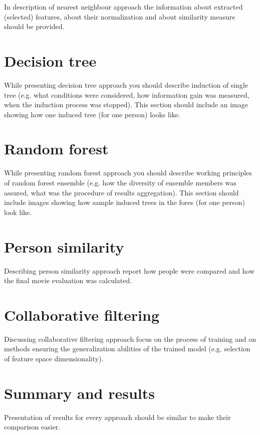 \documentclass{article}
\begin{document}
\vspace{0.5cm}
In description of nearest neighbour approach the information about extracted (selected) features, about their normalization and about similarity measure should be provided.


\newpage
\section{Decision tree}
While presenting decision tree approach you should describe induction of single tree (e.g. what conditions were considered, how information gain was measured, when the induction process was stopped). This section should include an image showing how one induced tree (for one person) looks like.


\newpage
\section{Random forest}
While presenting random forest approach you should describe working principles of random forest ensemble (e.g. how the diversity of ensemble members was assured, what was the procedure of results aggregation). This section should include images showing how sample induced trees in the fores (for one person) look like.


\newpage
\section{Person similarity}
Describing person similarity approach report how people were compared and how the final movie evaluation was calculated.


\newpage
\section{Collaborative filtering}
Discussing collaborative filtering approach focus on the process of training and on methods ensuring the generalization abilities of the trained model (e.g. selection of feature space dimensionality).


\newpage
\section{Summary and results}
Presentation of results for every approach should be similar to make their comparison easier.
\end{document}
